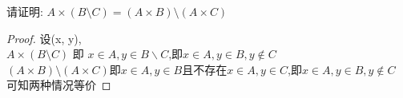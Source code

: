 \documentclass[a4paper, justified]{tufte-handout}
\begin{document}
\begin{problem}
请证明:
$A \times (B \setminus C) = (A \times B) \setminus (A \times C)$

\end{problem}

\begin{proof}
  设(x, y),\\
  $A \times (B \setminus C)$ 即 $x \in A, y\in B \backslash C$,即$x \in A,y\in B,y \notin C$\\
  $(A \times B) \setminus (A \times C)$即$x \in A, y\in B$且不存在$x \in A, y\in C$,即$x \in A,y\in B,y \notin C$\\
  可知两种情况等价

\end{proof}

\beginoptional

\begin{problem}[UD Problem 9.23]
\end{problem}

\begin{solution}
\end{solution}

\beginot

%
%
%
\end{document}
